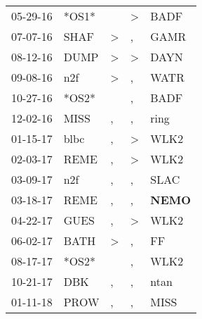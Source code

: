 \begin{supertabular}{p{0.07\textwidth}p{0.06\textwidth}p{0.02\textwidth}p{0.02\textwidth}p{0.06\textwidth}}
          05-29-16\textsuperscript{} &                            *OS1* &                  &  \textgreater &           BADF\textsuperscript{} \\
          07-07-16\textsuperscript{} &           SHAF\textsuperscript{} &     \textgreater &             , &           GAMR\textsuperscript{} \\
          08-12-16\textsuperscript{} &           DUMP\textsuperscript{} &     \textgreater &  \textgreater &           DAYN\textsuperscript{} \\
          09-08-16\textsuperscript{} &            n2f\textsuperscript{} &     \textgreater &             , &           WATR\textsuperscript{} \\
          10-27-16\textsuperscript{} &                            *OS2* &                  &             , &           BADF\textsuperscript{} \\
          12-02-16\textsuperscript{} &           MISS\textsuperscript{} &                , &             , &           ring\textsuperscript{} \\
          01-15-17\textsuperscript{} &           blbc\textsuperscript{} &                , &  \textgreater &           WLK2\textsuperscript{} \\
          02-03-17\textsuperscript{} &           REME\textsuperscript{} &                , &  \textgreater &           WLK2\textsuperscript{} \\
          03-09-17\textsuperscript{} &            n2f\textsuperscript{} &                , &             , &           SLAC\textsuperscript{} \\
          03-18-17\textsuperscript{} &           REME\textsuperscript{} &                , &             , &  \textbf{NEMO\textsuperscript{}} \\
          04-22-17\textsuperscript{} &           GUES\textsuperscript{} &                , &  \textgreater &           WLK2\textsuperscript{} \\
          06-02-17\textsuperscript{} &           BATH\textsuperscript{} &     \textgreater &             , &             FF\textsuperscript{} \\
          08-17-17\textsuperscript{} &                            *OS2* &                  &             , &           WLK2\textsuperscript{} \\
          10-21-17\textsuperscript{} &            DBK\textsuperscript{} &                , &             , &           ntan\textsuperscript{} \\
          01-11-18\textsuperscript{} &           PROW\textsuperscript{} &                , &             , &           MISS\textsuperscript{} \\

\end{supertabular}
